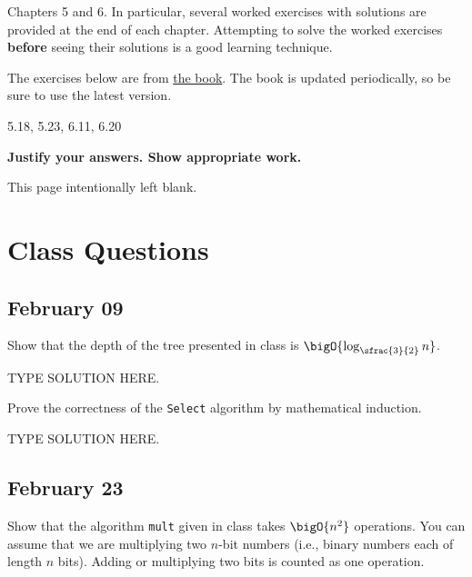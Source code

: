 \documentclass[draft]{article}
\begin{document}
\begin{titlepage}
    \begin{tcolorbox}[title=Reading,fonttitle=\bfseries]
        Chapters 5 and 6. In particular, several worked exercises with solutions are provided at the end of each chapter. Attempting to solve the worked exercises \textbf{before} seeing their solutions is a good learning technique.
    \end{tcolorbox}
    The exercises below are from \href{https://sites.google.com/site/gopalpandurangan/home/algorithms-course}{the book}. The book is updated periodically, so be sure to use the latest version.

    \begin{tcolorbox}[title=Exercises,fonttitle=\bfseries]
        5.18, 5.23, 6.11, 6.20
    \end{tcolorbox}

    \textbf{Justify your answers. Show appropriate work.}
\end{titlepage}
\vspace*{\fill}\begin{center}{\Huge This page intentionally left blank.}\end{center}\vspace*{\fill}\thispagestyle{empty}\clearpage
{}

\section{Class Questions}
\subsection{February 09}

\begin{question}
    Show that the depth of the tree presented in class is $\bigO{\log_{\sfrac{3}{2}}n}$.
\end{question}

\begin{solution}
    TYPE SOLUTION HERE.
\end{solution}

\begin{question}
    Prove the correctness of the \texttt{Select} algorithm by mathematical induction.
\end{question}

\begin{solution}
    TYPE SOLUTION HERE.
\end{solution}

\subsection{February 23}
\begin{question}
    Show that the algorithm \texttt{mult} given in class takes $\bigO{n^2}$ operations. You can assume
    that we are multiplying two $n$-bit numbers (i.e., binary numbers each of length $n$  bits). Adding or multiplying two bits is counted as one operation.
 
\end{question}
\end{document}
